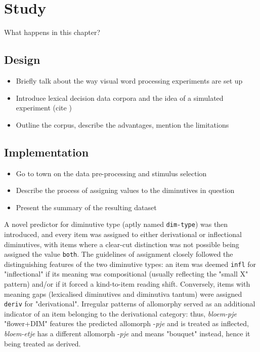 \chapter{Study}\label{chp:study}

What happens in this chapter?

\section{Design}
\begin{itemize}
\item Briefly talk about the way visual word processing experiments are set up
\item Introduce lexical decision data corpora and the idea of a simulated experiment (cite \cite{Brysbaert+etal+2016})
\item Outline the corpus, describe the advantages, mention the limitations
\end{itemize}
\section{Implementation}
\begin{itemize}
\item Go to town on the data pre-processing and stimulus selection
\item Describe the process of assigning values to the diminutives in question
\item Present the summary of the resulting dataset
\end{itemize}

A novel predictor for diminutive type (aptly named \texttt{dim-type}) was then introduced, and every item was assigned to either derivational or inflectional diminutives, with items where a clear-cut distinction was not possible being assigned the value \texttt{both}. The guidelines of assignment closely followed the distinguishing features of the two diminutive types: an item was deemed \texttt{infl} for "inflectional" if its meaning was compositional (usually reflecting the "small X" pattern) and/or if it forced a kind-to-item reading shift. Conversely, items with meaning gaps (lexicalised diminutives and diminutiva tantum) were assigned \texttt{deriv} for "derivational". Irregular patterns of allomorphy served as an additional indicator of an item belonging to the derivational category: thus, \textit{bloem-pje} "flower+DIM" features the predicted allomorph -\textit{pje} and is treated as inflected, \textit{bloem-etje} has a different allomorph -\textit{pje} and means "bouquet" instead, hence it being treated as derived.  

